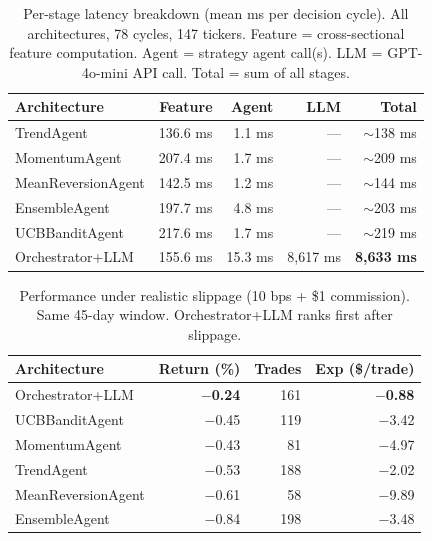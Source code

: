 \documentclass[10pt,conference]{IEEEtran}
\begin{document}
\begin{table}[h]
    \centering
    \caption{Per-stage latency breakdown (mean ms per decision cycle). All architectures, 78 cycles, 147 tickers. Feature = cross-sectional feature computation. Agent = strategy agent call(s). LLM = GPT-4o-mini API call. Total = sum of all stages.}
    \begin{tabular}{lrrrr}
        \toprule
        \textbf{Architecture} & \textbf{Feature} & \textbf{Agent} & \textbf{LLM} & \textbf{Total} \\
        \midrule
        TrendAgent         & 136.6 ms & 1.1 ms  & ---       & $\sim$138 ms \\
        MomentumAgent      & 207.4 ms & 1.7 ms  & ---       & $\sim$209 ms \\
        MeanReversionAgent & 142.5 ms & 1.2 ms  & ---       & $\sim$144 ms \\
        EnsembleAgent      & 197.7 ms & 4.8 ms  & ---       & $\sim$203 ms \\
        UCBBanditAgent     & 217.6 ms & 1.7 ms  & ---       & $\sim$219 ms \\
        Orchestrator+LLM   & 155.6 ms & 15.3 ms & 8,617 ms  & \textbf{8,633 ms} \\
        \bottomrule
    \end{tabular}
    \label{tab:exp1_latency}
\end{table}

\begin{table}[h]
    \centering
    \caption{Performance under realistic slippage (10 bps + \$1 commission). Same 45-day window. Orchestrator+LLM ranks first after slippage.}
    \begin{tabular}{lrrr}
        \toprule
        \textbf{Architecture} & \textbf{Return (\%)} & \textbf{Trades} & \textbf{Exp (\$/trade)} \\
        \midrule
        Orchestrator+LLM   & \textbf{$-$0.24} & 161 & \textbf{$-$0.88} \\
        UCBBanditAgent     & $-$0.45 & 119 & $-$3.42 \\
        MomentumAgent      & $-$0.43 & 81  & $-$4.97 \\
        TrendAgent         & $-$0.53 & 188 & $-$2.02 \\
        MeanReversionAgent & $-$0.61 & 58  & $-$9.89 \\
        EnsembleAgent      & $-$0.84 & 198 & $-$3.48 \\
        \bottomrule
    \end{tabular}
    \label{tab:exp1_perf}
\end{table}
\end{document}
